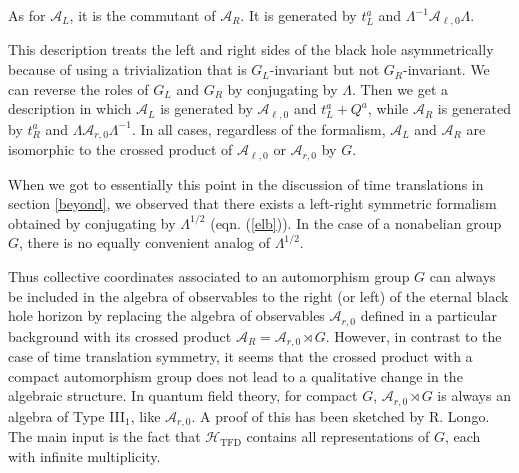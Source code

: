 \documentclass[11pt,a4paper]{article}
\def\A{{\mathcal A}}
\def\H{{\mathcal H}}
\def\TFD{{\mathrm{TFD}}}
\begin{document}
As for $\A_L$, it is the commutant of $\A_R$.   It is generated by $t_L^a$ and $\Lambda^{-1} \A_{\ell,0}\Lambda$.   

This description treats the left and right sides of the black hole asymmetrically because of using a trivialization that is $G_L$-invariant but not $G_R$-invariant.
We can reverse the roles of $G_L$ and $G_R$ by conjugating by $\Lambda$.   Then we get a description in which $\A_L$ is generated by $\A_{\ell,0}$ and
$t_L^a+Q^a$, while $\A_R$ is generated by $t_R^a$ and $\Lambda \A_{r,0}\Lambda^{-1}$.      In all cases, regardless of the formalism, $\A_L$ and $\A_R$
are isomorphic to the crossed product of $\A_{\ell,0}$ or $\A_{r,0}$ by $G$.
 
 When we got to essentially this point in the discussion of time translations in section \ref{beyond}, we observed that there exists a left-right symmetric
 formalism obtained by conjugating by $\Lambda^{1/2}$ (eqn. (\ref{elb})). In the case of a nonabelian group $G$, there is  no equally convenient
 analog of $\Lambda^{1/2}$.
 
 Thus collective coordinates associated to an automorphism group $G$ 
 can always be included in the algebra of observables to the right (or left) of the eternal black hole horizon by replacing
 the  algebra of observables $\A_{r,0}$  defined in a particular background with its crossed product $\A_R=\A_{r,0}\rtimes G$.   However, in contrast
 to the case of time translation symmetry, it seems that the crossed product with a compact automorphism group does not lead to a qualitative change in the
 algebraic structure.  In quantum field theory, for compact $G$, $\A_{r,0}\rtimes G$ is always an algebra of Type III$_1$, like $\A_{r,0}$.  A proof of this
 has been sketched by R. Longo.   The main input is the fact that $\H_{\TFD}$ contains all representations of $G$, each with infinite multiplicity.
 
\end{document}
